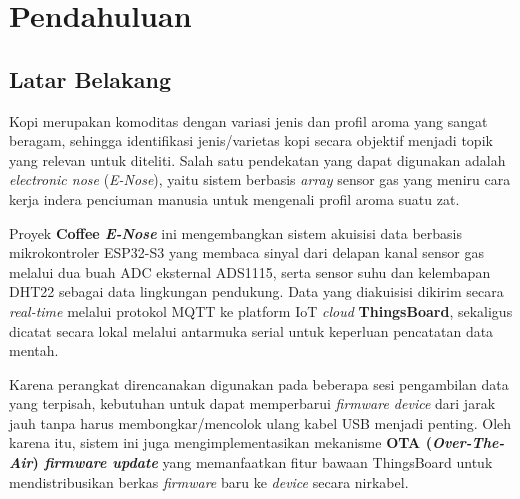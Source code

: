 \documentclass[12pt,a4paper]{report}
\begin{document}
\tableofcontents
\newpage
{}

\chapter{Pendahuluan}

\section{Latar Belakang}
Kopi merupakan komoditas dengan variasi jenis dan profil aroma yang sangat beragam,
sehingga identifikasi jenis/varietas kopi secara objektif menjadi topik yang relevan
untuk diteliti. Salah satu pendekatan yang dapat digunakan adalah \textit{electronic
nose} (\textit{E-Nose}), yaitu sistem berbasis \textit{array} sensor gas yang meniru cara kerja indera
penciuman manusia untuk mengenali profil aroma suatu zat.

Proyek \textbf{Coffee \textit{E-Nose}} ini mengembangkan sistem akuisisi data berbasis
mikrokontroler ESP32-S3 yang membaca sinyal dari delapan kanal sensor gas melalui dua
buah ADC eksternal ADS1115, serta sensor suhu dan kelembapan DHT22 sebagai data
lingkungan pendukung. Data yang diakuisisi dikirim secara \textit{real-time} melalui
protokol MQTT ke platform IoT \textit{cloud} \textbf{ThingsBoard}, sekaligus dicatat secara lokal
melalui antarmuka serial untuk keperluan pencatatan data mentah.

Karena perangkat direncanakan digunakan pada beberapa sesi pengambilan data yang
terpisah, kebutuhan untuk dapat memperbarui \textit{firmware device} dari jarak jauh tanpa harus
membongkar/mencolok ulang kabel USB menjadi penting. Oleh karena itu, sistem ini juga
mengimplementasikan mekanisme \textbf{OTA (\textit{Over-The-Air}) \textit{firmware update}} yang
memanfaatkan fitur bawaan ThingsBoard untuk mendistribusikan berkas \textit{firmware} baru ke
\textit{device} secara nirkabel.
\end{document}
